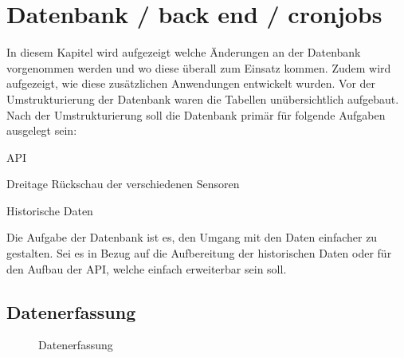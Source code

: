 \section{Datenbank / back end / cronjobs}
In diesem Kapitel wird aufgezeigt welche Änderungen an der Datenbank vorgenommen werden und wo diese überall zum Einsatz kommen. Zudem wird aufgezeigt, wie diese zusätzlichen Anwendungen entwickelt wurden. Vor der Umstrukturierung der Datenbank waren die Tabellen unübersichtlich aufgebaut. Nach der Umstrukturierung soll die Datenbank primär für folgende Aufgaben ausgelegt sein:\\
\begin{itemize*}
\item API
\item Dreitage Rückschau der verschiedenen Sensoren
\item Historische Daten
\end{itemize*}

Die Aufgabe der Datenbank ist es, den Umgang mit den Daten einfacher zu gestalten. Sei es in Bezug auf die Aufbereitung der historischen Daten oder für den Aufbau der API, welche einfach erweiterbar sein soll.



\subsection{Datenerfassung}

\begin{figure}[htbp!]
	\centering
	\caption{Datenerfassung}
	\label{img:datenerfassung}
\end{figure}




